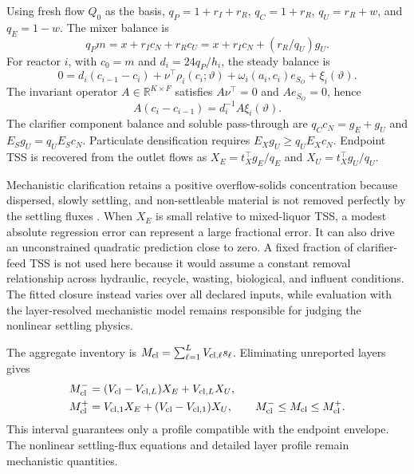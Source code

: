 \documentclass[a4paper,fleqn]{cas-sc}
\newcommand{\R}{\mathbb{R}}
\begin{document}
Using fresh flow $Q_0$ as the basis, $q_P=1+r_I+r_R$, $q_C=1+r_R$, $q_U=r_R+w$, and $q_E=1-w$. The mixer balance is
\begin{equation}
q_Pm=x+r_Ic_N+r_Rc_U=x+r_Ic_N+(r_R/q_U)g_U.
\label{eq:Smixer}
\end{equation}
For reactor $i$, with $c_0=m$ and $d_i=24q_P/h_i$, the steady balance is
\begin{equation}
0=d_i(c_{i-1}-c_i)+\nu^\top\rho_i(c_i;\vartheta)+\omega_i(a_i,c_i)e_{S_O}+\xi_i(\vartheta).
\label{eq:Sreactor}
\end{equation}
The invariant operator $A\in\R^{K\times F}$ satisfies $A\nu^\top=0$ and $Ae_{S_O}=0$, hence
\begin{equation}
A(c_i-c_{i-1})=d_i^{-1}A\xi_i(\vartheta).
\label{eq:Sinvariants}
\end{equation}
The clarifier component balance and soluble pass-through are $q_Cc_N=g_E+g_U$ and $E_Sg_U=q_UE_Sc_N$. Particulate densification requires $E_Xg_U\ge q_UE_Xc_N$. Endpoint TSS is recovered from the outlet flows as $X_E=t_X^\top g_E/q_E$ and $X_U=t_X^\top g_U/q_U$.

Mechanistic clarification retains a positive overflow-solids concentration because dispersed, slowly settling, and non-settleable material is not removed perfectly by the settling fluxes \citep{Takacs1991}. When $X_E$ is small relative to mixed-liquor TSS, a modest absolute regression error can represent a large fractional error. It can also drive an unconstrained quadratic prediction close to zero. A fixed fraction of clarifier-feed TSS is not used here because it would assume a constant removal relationship across hydraulic, recycle, wasting, biological, and influent conditions. The fitted closure instead varies over all declared inputs, while evaluation with the layer-resolved mechanistic model remains responsible for judging the nonlinear settling physics.

The aggregate inventory is $M_{\rm cl}=\sum_{\ell=1}^L V_{{\rm cl},\ell}s_\ell$. Eliminating unreported layers gives
\begin{align}
M_{\rm cl}^{-}&=(V_{\rm cl}-V_{{\rm cl},L})X_E+V_{{\rm cl},L}X_U,\notag\\
M_{\rm cl}^{+}&=V_{{\rm cl},1}X_E+(V_{\rm cl}-V_{{\rm cl},1})X_U,\qquad
M_{\rm cl}^{-}\le M_{\rm cl}\le M_{\rm cl}^{+}.
\label{eq:Sinventory}
\end{align}
This interval guarantees only a profile compatible with the endpoint envelope. The nonlinear settling-flux equations and detailed layer profile remain mechanistic quantities.
\end{document}
